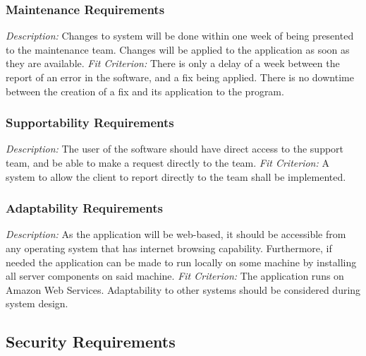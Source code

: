 \documentclass[12pt, titlepage]{article}
\begin{document}
\subsubsection{Maintenance Requirements}
\textit{Description:}\newline
Changes to system will be done within one week of being presented to the maintenance team. Changes will be applied to the application as soon as they are available.
\newline \newline 
\textit{Fit Criterion:}\newline 
There is only a delay of a week between the report of an error in the software, and a fix being applied. There is no downtime between the creation of a fix and its application to the program.

\subsubsection{Supportability Requirements}
\textit{Description:}\newline
The user of the software should have direct access to the support team, and be able to make a request directly to the team.
\newline \newline 
\textit{Fit Criterion:}\newline 
A system to allow the client to report directly to the team shall be implemented.

\subsubsection{Adaptability Requirements}
\textit{Description:}\newline
As the application will be web-based, it should be accessible from any operating system that has internet browsing capability. Furthermore, if needed the application can be made to run locally on some machine by installing all server components on said machine.
\newline \newline 
\textit{Fit Criterion:}\newline 
The application runs on Amazon Web Services. Adaptability to other systems should be considered during system design.

\subsection{Security Requirements}
\end{document}
